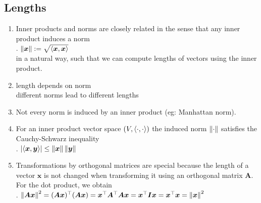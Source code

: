 \subsection{Lengths}

\begin{enumerate}
    \item Inner products and norms are closely related in the sense that any inner product induces a norm
    \hfill \cite{mfml/book/mml/Deisenroth-Faisal-Ong}
    \\
    .\hfill
    $\left\| \bm{x} \right\| := \sqrt{\langle\bm{x}, \bm{x}\rangle}$
    \hfill \cite{mfml/book/mml/Deisenroth-Faisal-Ong}
    \\
    in a natural way, such that we can compute lengths of vectors using the inner product.
    \hfill \cite{mfml/book/mml/Deisenroth-Faisal-Ong}

    \item length depends on norm
    \hfill \cite{common/online/chatgpt}
    \\
    different norms lead to different lengths
    \hfill \cite{common/online/chatgpt}

    \item Not every norm is induced by an inner product (eg: Manhattan norm).
    \hfill \cite{mfml/book/mml/Deisenroth-Faisal-Ong}

    \item 
    \begin{definition}
    For an inner product vector space $(V,\langle\cdot, \cdot\rangle)$ the induced norm $\left\| \cdot \right\|$ satisfies the Cauchy-Schwarz inequality
    \hfill \cite{mfml/book/mml/Deisenroth-Faisal-Ong}
    \\
    .\hfill
    $\left| \langle\bm{x}, \bm{y}\rangle \right| \leq \left\| \bm{x} \right\| \left\| \bm{y} \right\|$
    \hfill \cite{mfml/book/mml/Deisenroth-Faisal-Ong}
    \end{definition}

    \item Transformations by orthogonal matrices are special because the length of a vector $\bm{x}$ is not changed when transforming it using an orthogonal matrix $\bm{A}$. 
    For the dot product, we obtain
    \hfill \cite{mfml/book/mml/Deisenroth-Faisal-Ong}
    \\
    .\hfill
    $
        \left\| \bm{Ax} \right\|^2 
        = (\bm{Ax})^\top (\bm{Ax})
        = \bm{x}^\top \bm{A}^\top \bm{Ax}
        = \bm{x}^\top \bm{Ix}
        = \bm{x}^\top \bm{x}
        = \left\| \bm{x} \right\|^2
    $
    \hfill \cite{mfml/book/mml/Deisenroth-Faisal-Ong}
\end{enumerate}





